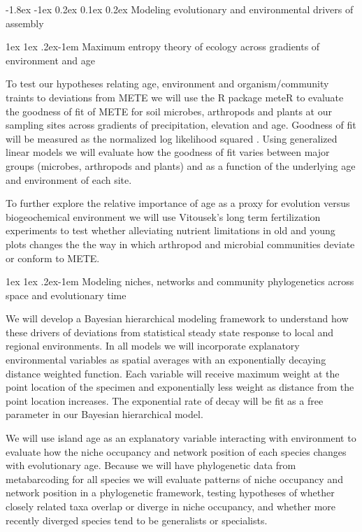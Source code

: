\documentclass[11pt]{article}
\makeatletter
\renewcommand\subsubsection{\@startsection{subsection}{1}{\z@}%
                                  {-1.8ex \@plus -1ex \@minus 0.2ex}%
                                  {0.1ex \@plus 0.2ex}%
                                  {\normalfont\bfseries}}
\renewcommand{\paragraph}{\@startsection{paragraph}{4}{\z@}
  {1ex \@plus 1ex \@minus .2ex}{-1em}
  {\normalfont\normalsize\it}
}
\makeatother
\begin{document}
\subsubsection{Modeling evolutionary and environmental drivers of
  assembly}


\paragraph{Maximum entropy theory of ecology across gradients of
  environment and age}

To test our hypotheses relating age, environment and
organism/community traints to deviations from METE we will use the R
package meteR \citep[developed by Rominger][]{romingerMeteR} to
evaluate the goodness of fit of METE for soil microbes, arthropods and
plants at our sampling sites across gradients of precipitation,
elevation and age.  Goodness of fit will be measured as the normalized
log likelihood squared \citep[described in][]{romingerMeteR}. Using
generalized linear models we will evaluate how the goodness of fit
varies between major groups (microbes, arthropods and plants) and as a
function of the underlying age and environment of each site.

To further explore the relative importance of age as a proxy for
evolution versus biogeochemical environment we will use Vitousek’s
long term fertilization experiments to test whether alleviating
nutrient limitations in old and young plots changes the the way in
which arthropod and microbial communities deviate or conform to METE.


\paragraph{Modeling niches, networks and community phylogenetics
  across space and evolutionary time}

We will develop a Bayesian hierarchical modeling framework to
understand how these drivers of deviations from statistical steady
state response to local and regional environments.  In all models we
will incorporate explanatory environmental variables as spatial
averages with an exponentially decaying distance weighted function.
Each variable will receive maximum weight at the point location of the
specimen and exponentially less weight as distance from the point
location increases.  The exponential rate of decay will be fit as a
free parameter in our Bayesian hierarchical model.

We will use island age as an explanatory variable interacting with
environment to evaluate how the niche occupancy and network position
of each species changes with evolutionary age.  Because we will have
phylogenetic data from metabarcoding for all species we will evaluate
patterns of niche occupancy and network position in a phylogenetic
framework, testing hypotheses of whether closely related taxa overlap
or diverge in niche occupancy, and whether more recently diverged
species tend to be generalists or specialists.
\end{document}
